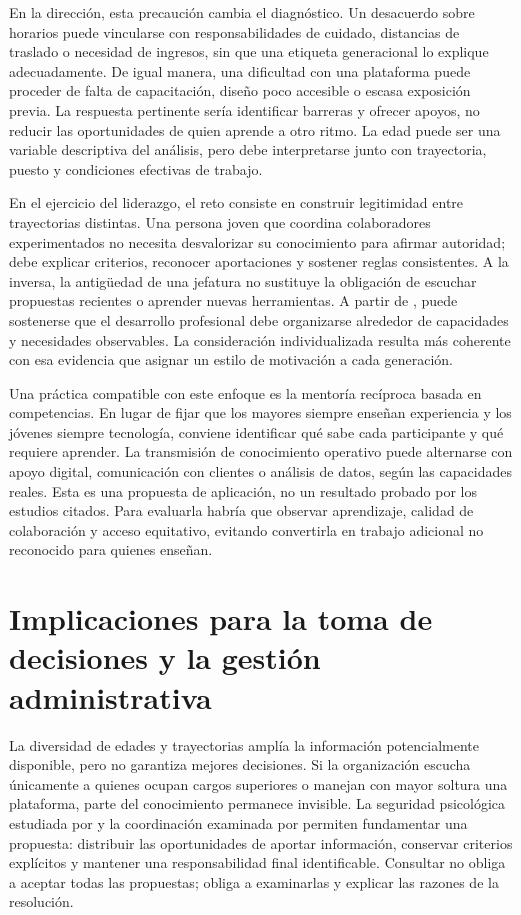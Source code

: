 \documentclass[12pt,letterpaper,oneside]{article}
\begin{document}
En la dirección, esta precaución cambia el diagnóstico. Un desacuerdo sobre horarios puede vincularse con responsabilidades de cuidado, distancias de traslado o necesidad de ingresos, sin que una etiqueta generacional lo explique adecuadamente. De igual manera, una dificultad con una plataforma puede proceder de falta de capacitación, diseño poco accesible o escasa exposición previa. La respuesta pertinente sería identificar barreras y ofrecer apoyos, no reducir las oportunidades de quien aprende a otro ritmo. La edad puede ser una variable descriptiva del análisis, pero debe interpretarse junto con trayectoria, puesto y condiciones efectivas de trabajo.

En el ejercicio del liderazgo, el reto consiste en construir legitimidad entre trayectorias distintas. Una persona joven que coordina colaboradores experimentados no necesita desvalorizar su conocimiento para afirmar autoridad; debe explicar criterios, reconocer aportaciones y sostener reglas consistentes. A la inversa, la antigüedad de una jefatura no sustituye la obligación de escuchar propuestas recientes o aprender nuevas herramientas. A partir de \textcite{rudolph2021}, puede sostenerse que el desarrollo profesional debe organizarse alrededor de capacidades y necesidades observables. La consideración individualizada resulta más coherente con esa evidencia que asignar un estilo de motivación a cada generación.

Una práctica compatible con este enfoque es la mentoría recíproca basada en competencias. En lugar de fijar que los mayores siempre enseñan experiencia y los jóvenes siempre tecnología, conviene identificar qué sabe cada participante y qué requiere aprender. La transmisión de conocimiento operativo puede alternarse con apoyo digital, comunicación con clientes o análisis de datos, según las capacidades reales. Esta es una propuesta de aplicación, no un resultado probado por los estudios citados. Para evaluarla habría que observar aprendizaje, calidad de colaboración y acceso equitativo, evitando convertirla en trabajo adicional no reconocido para quienes enseñan.

\section*{Implicaciones para la toma de decisiones y la gestión administrativa}

La diversidad de edades y trayectorias amplía la información potencialmente disponible, pero no garantiza mejores decisiones. Si la organización escucha únicamente a quienes ocupan cargos superiores o manejan con mayor soltura una plataforma, parte del conocimiento permanece invisible. La seguridad psicológica estudiada por \textcite{edmondson1999} y la coordinación examinada por \textcite{hoch2014} permiten fundamentar una propuesta: distribuir las oportunidades de aportar información, conservar criterios explícitos y mantener una responsabilidad final identificable. Consultar no obliga a aceptar todas las propuestas; obliga a examinarlas y explicar las razones de la resolución.
\end{document}
